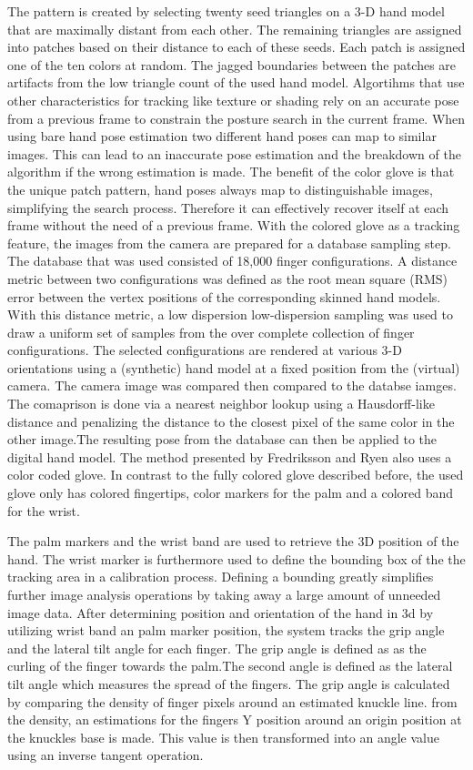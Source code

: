 The pattern is created by selecting twenty seed triangles on a 3-D hand model that are maximally distant from each other. The remaining triangles are assigned into patches based on their distance to each of these seeds. Each patch is assigned one of the ten colors at random. The jagged boundaries between the patches are artifacts from the low triangle count of the used hand model.
Algortihms that use other characteristics for tracking like texture or shading \cite{LaGorce.2008} rely on an accurate pose from a previous frame to constrain the posture search in the current frame. When using bare hand pose estimation two different hand poses can map to similar images. This can lead to an inaccurate pose estimation and the breakdown of the algorithm if the wrong estimation is made.
The benefit of the color glove is that the unique patch pattern, hand poses always map to distinguishable images, simplifying the search process. Therefore it can effectively recover itself at each frame without the need of a previous frame.
With the colored glove as a tracking feature, the images from the camera are prepared for a database sampling step. The database that was used consisted of 18,000 finger configurations. 
A distance metric between two configurations was defined as the root mean square (RMS) error between the vertex positions of the corresponding skinned hand models. With this distance metric, a low dispersion low-dispersion sampling was used to draw a uniform set of samples from the over complete collection of finger configurations.
The selected configurations are rendered at various 3-D orientations using a (synthetic) hand model at a fixed position from the (virtual) camera.
The camera image was compared then compared to the databse iamges. The comaprison is done via a nearest neighbor lookup using a Hausdorff-like distance \cite{Huttenlocher.1993} and penalizing the distance to the closest pixel of the same color in the other image.The resulting pose from the database can then be applied to the digital hand model.
The method presented by Fredriksson and Ryen \cite{Fredriksson.2008} also uses a color coded glove. In contrast to the fully colored glove described before, the used glove only has colored fingertips, color markers for the palm and a colored band for the wrist.

The palm markers and the wrist band are used to retrieve the 3D position of the hand. The wrist marker is furthermore used to define the bounding box of the the tracking area in a calibration process. Defining a bounding greatly simplifies further image analysis operations by taking away a large amount of unneeded image data.
After determining position and orientation of the hand in 3d by utilizing wrist band an palm marker position, the system tracks the grip angle and the lateral tilt angle for each finger. The grip angle is defined as as the curling of the finger towards the palm.The second angle is defined as the lateral tilt angle which measures the spread of the fingers.
The grip angle is calculated by comparing the density of finger pixels around an estimated knuckle line. from the density, an estimations for the fingers Y position around an origin position at the knuckles base is made. This value is then transformed into an angle value using an inverse tangent operation.

